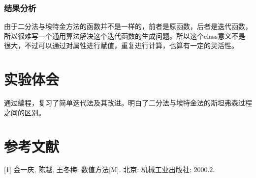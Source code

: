 \documentclass[UTF8, a4paper, zihao=-4, bibliography=totoc]{ctexart}
\begin{document}
\subsubsection{结果分析}

由于二分法与埃特金方法的函数并不是一样的，前者是原函数，后者是迭代函数，所以很难写一个通用算法解决这个迭代函数的生成问题。所以这个class意义不是很大，不过可以通过对属性进行赋值，重复进行计算，也算有一定的灵活性。

\section{实验体会}

通过编程，复习了简单迭代法及其改进。明白了二分法与埃特金法的斯坦弗森过程之间的区别。

\section{参考文献}

[1] 金一庆, 陈越, 王冬梅. 数值方法[M]. 北京: 机械工业出版社; 2000.2.
\end{document}
